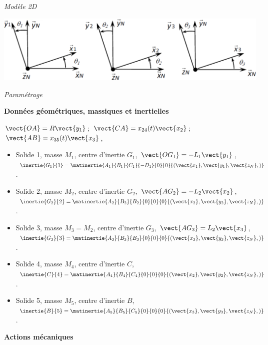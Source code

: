 \begin{multicols}{2}
\begin{center}
\textit{Modèle 2D}
\end{center}

\begin{center}
\includegraphics[width=\linewidth]{images/fig_05_b}

\textit{Paramétrage}
\end{center}

\textbf{Données géométriques, massiques et inertielles}
\begin{multicols}{2}
\footnotesize

$\vect{OA}=R\vect{y_1}$; $\vect{CA}=x_{24}(t)\vect{x_2}$; $\vect{AB}=x_{35}(t)\vect{x_3}$, 
\begin{itemize}
\item Solide 1, masse $M_1$, centre d'inertie $G_1$, $\vect{OG_1}=-L_1\vect{y_1}$, $\inertie{G_1}{1}=\matinertie{A_1}{B_1}{C_1}{-D_1}{0}{0}{\left(\vect{x_1},\vect{y_1},\vect{z_N}, \right)}$.
\item Solide 2, masse $M_2$, centre d'inertie $G_2$, $\vect{AG_2}=-L_2\vect{x_2}$, $\inertie{G_2}{2}=\matinertie{A_2}{B_2}{B_2}{0}{0}{0}{\left(\vect{x_2},\vect{y_2},\vect{z_N}, \right)}$.
\item Solide 3, masse $M_3=M_2$, centre d'inertie $G_3$, $\vect{AG_3}=L_2\vect{x_3}$, $\inertie{G_3}{3}=\matinertie{A_3}{B_3}{B_3}{0}{0}{0}{\left(\vect{x_3},\vect{y_3},\vect{z_N}, \right)}$.
\item Solide 4, masse $M_4$, centre d'inertie $C$, $\inertie{C}{4}=\matinertie{A_4}{B_4}{C_4}{0}{0}{0}{\left(\vect{x_2},\vect{y_2},\vect{z_N}, \right)}$.
\item Solide 5, masse $M_5$, centre d'inertie $B$, $\inertie{B}{5}=\matinertie{A_5}{B_5}{C_5}{0}{0}{0}{\left(\vect{x_3},\vect{y_3},\vect{z_N}, \right)}$.
\end{itemize}
\normalsize

\end{multicols}

\textbf{Actions mécaniques}


\end{multicols}
